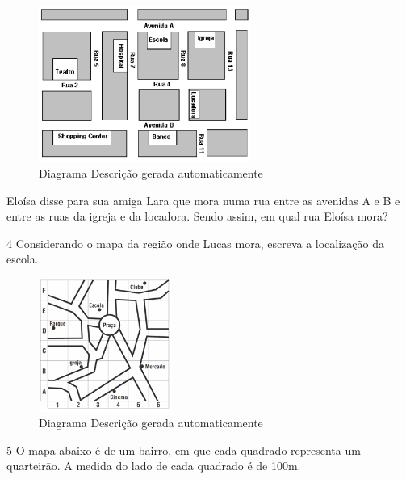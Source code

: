 \begin{escolha}
\begin{escolha}
\begin{escolha}
\begin{escolha}
{\begin{boxmedio}
\begin{boxpeq}
\begin{q°}
\begin{boxmedio}
\begin{boxpeq}
\begin{boxpeq}
\begin{boxmedio}
\begin{boxmedio}
\begin{boxmedio}
\begin{figure}
\centering
\includegraphics[width=2.74306in,height=2.00374in]{./_SAEB_9_MAT/media/image200.png}
\caption{Diagrama Descrição gerada automaticamente}
\end{figure}


Eloísa disse para sua amiga Lara que mora numa rua entre as avenidas A e
B e entre as ruas da igreja e da locadora. Sendo assim, em qual rua Eloísa
mora?


\num{4} Considerando o mapa da região onde Lucas mora, escreva a localização
da escola.

\begin{figure}
\centering
\includegraphics[width=1.71528in,height=1.71528in]{./_SAEB_9_MAT/media/image201.png}
\caption{Diagrama Descrição gerada automaticamente}
\end{figure}



\num{5} O mapa abaixo é de um bairro, em que cada quadrado representa um
quarteirão. A medida do lado de cada quadrado é de 100m.


\end{boxmedio}
\end{boxmedio}
\end{boxmedio}
\end{boxpeq}
\end{boxpeq}
\end{boxmedio}
\end{q°}
\end{boxpeq}
\end{boxmedio}}
\end{escolha}
\end{escolha}
\end{escolha}
\end{escolha}
